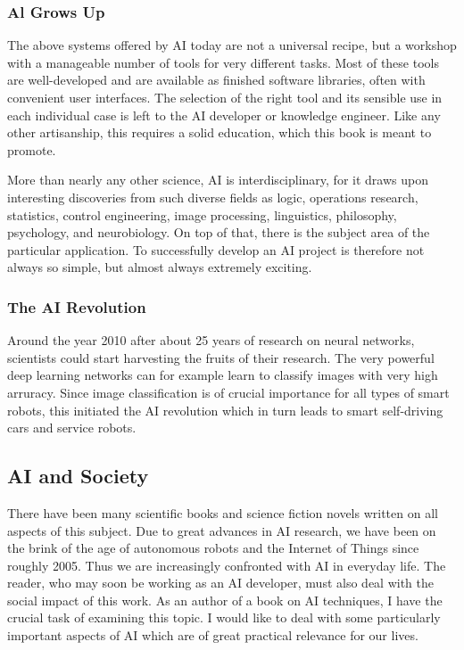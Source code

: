 \documentclass[10pt]{book}
\begin{document}
\subsubsection*{Al Grows Up}
The above systems offered by AI today are not a universal recipe, but a workshop with a manageable number of tools for very different tasks. Most of these tools are well-developed and are available as finished software libraries, often with convenient user interfaces. The selection of the right tool and its sensible use in each individual case is left to the AI developer or knowledge engineer. Like any other artisanship, this requires a solid education, which this book is meant to promote.

More than nearly any other science, AI is interdisciplinary, for it draws upon interesting discoveries from such diverse fields as logic, operations research, statistics, control engineering, image processing, linguistics, philosophy, psychology, and neurobiology. On top of that, there is the subject area of the particular application. To successfully develop an AI project is therefore not always so simple, but almost always extremely exciting.

\subsubsection*{The AI Revolution}
Around the year 2010 after about 25 years of research on neural networks, scientists could start harvesting the fruits of their research. The very powerful deep learning networks can for example learn to classify images with very high arruracy. Since image classification is of crucial importance for all types of smart robots, this initiated the AI revolution which in turn leads to smart self-driving cars and service robots.

\subsection*{AI and Society}
There have been many scientific books and science fiction novels written on all aspects of this subject. Due to great advances in AI research, we have been on the brink of the age of autonomous robots and the Internet of Things since roughly 2005. Thus we are increasingly confronted with AI in everyday life. The reader, who may soon be working as an AI developer, must also deal with the social impact of this work. As an author of a book on AI techniques, I have the crucial task of examining this topic. I would like to deal with some particularly important aspects of AI which are of great practical relevance for our lives.
\end{document}
